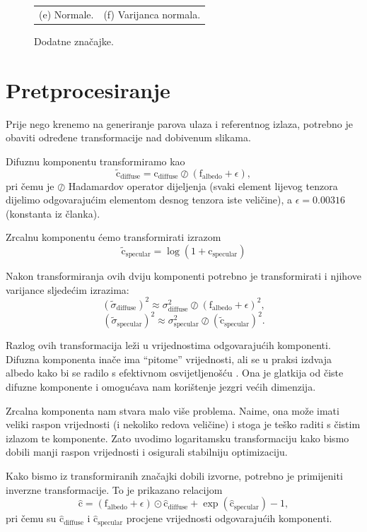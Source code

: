 \documentclass[times, utf8, seminar, numeric]{fer}
\newcommand{\vect}[1]{\bm{\mathrm{#1}}}
\begin{document}
\begin{figure}[H]
\begin{tabular}{cc}
(e) Normale. & (f) Varijanca normala. \\[6pt]
\end{tabular}
\caption{Dodatne značajke.}
\label{fig:additional_features}
\end{figure}

\section{Pretprocesiranje}
Prije nego krenemo na generiranje parova ulaza i referentnog izlaza, potrebno je obaviti određene
transformacije nad dobivenum slikama.

Difuznu komponentu transformiramo kao
$$ \vect{\tilde{c}}_{\mathrm{diffuse}} = \vect{c}_{\mathrm{diffuse}} \oslash (\vect{f}_{\mathrm{albedo}} + \epsilon), $$
pri čemu je $\oslash$ Hadamardov operator dijeljenja (svaki element lijevog tenzora dijelimo
odgovarajućim elementom desnog tenzora iste veličine), a $\epsilon = 0.00316$ (konstanta iz
članka).

Zrcalnu komponentu ćemo transformirati izrazom
$$ \vect{\tilde{c}}_{\mathrm{specular}} = \log(1 + \vect{c}_{\mathrm{specular}}) $$

Nakon transformiranja ovih dviju komponenti potrebno je transformirati i njihove varijance
sljedećim izrazima:
$$ (\tilde{\sigma}_{\mathrm{diffuse}})^2 \approx \sigma^2_{\mathrm{diffuse}} \oslash
(\vect{f}_{\mathrm{albedo}} + \epsilon)^2, $$
$$ (\tilde{\sigma}_{\mathrm{specular}})^2 \approx \sigma^2_{\mathrm{specular}} \oslash
(\vect{\tilde{c}}_{\mathrm{specular}})^2. $$

Razlog ovih transformacija leži u vrijednostima odgovarajućih komponenti. Difuzna komponenta
inače ima ``pitome'' vrijednosti, ali se u praksi izdvaja albedo kako bi se radilo s efektivnom
osvijetljenošću . Ona je glatkija od čiste difuzne komponente i
omogućava nam korištenje jezgri većih dimenzija.

Zrcalna komponenta nam stvara malo više problema. Naime, ona može imati veliki raspon vrijednosti
(i nekoliko redova veličine) i stoga je teško raditi s čistim izlazom te komponente. Zato uvodimo
logaritamsku transformaciju kako bismo dobili manji raspon vrijednosti i osigurali stabilniju
optimizaciju.

Kako bismo iz transformiranih značajki dobili izvorne, potrebno je primijeniti inverzne
transformacije. To je prikazano relacijom
$$ \vect{\hat{c}} = (\vect{f}_{\mathrm{albedo}} + \epsilon) \odot \vect{\hat{c}}_{\mathrm{diffuse}}
+ \exp(\vect{\hat{c}}_{\mathrm{specular}}) - 1, $$
pri čemu su $\vect{\hat{c}}_{\mathrm{diffuse}}$ i $\vect{\hat{c}}_{\mathrm{specular}}$ procjene vrijednosti
odgovarajućih komponenti.
\end{document}
